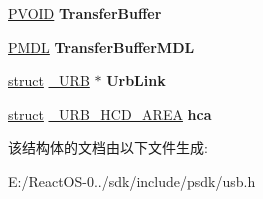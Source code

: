 \begin{DoxyCompactItemize}
\hyperlink{interfacevoid}{P\+V\+O\+ID} {\bfseries Transfer\+Buffer}
\item 
\mbox{\label{struct___u_r_b___b_u_l_k___o_r___i_n_t_e_r_r_u_p_t___t_r_a_n_s_f_e_r_a1a0d2e55717ec49c342948a84f965de8}} 
\hyperlink{interfacevoid}{P\+M\+DL} {\bfseries Transfer\+Buffer\+M\+DL}
\item 
\mbox{\label{struct___u_r_b___b_u_l_k___o_r___i_n_t_e_r_r_u_p_t___t_r_a_n_s_f_e_r_a5221575feba373de7001bec1d4c7362c}} 
\hyperlink{interfacestruct}{struct} \hyperlink{struct___u_r_b}{\+\_\+\+U\+RB} $\ast$ {\bfseries Urb\+Link}
\item 
\mbox{\label{struct___u_r_b___b_u_l_k___o_r___i_n_t_e_r_r_u_p_t___t_r_a_n_s_f_e_r_a9034525e1840979dcad138c6b46deb82}} 
\hyperlink{interfacestruct}{struct} \hyperlink{struct___u_r_b___h_c_d___a_r_e_a}{\+\_\+\+U\+R\+B\+\_\+\+H\+C\+D\+\_\+\+A\+R\+EA} {\bfseries hca}
\end{DoxyCompactItemize}


该结构体的文档由以下文件生成\+:\begin{DoxyCompactItemize}
\item 
E\+:/\+React\+O\+S-\/0../sdk/include/psdk/usb.\+h\end{DoxyCompactItemize}
